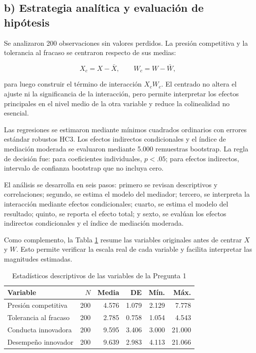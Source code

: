 \documentclass[12pt,letterpaper]{article}
\begin{document}
\subsection{b) Estrategia analítica y evaluación de hipótesis}

Se analizaron 200 observaciones sin valores perdidos. La presión competitiva y la tolerancia al fracaso se centraron respecto de sus medias:

\[
X_c=X-\bar X, \qquad W_c=W-\bar W,
\]

para luego construir el término de interacción $X_cW_c$. El centrado no altera el ajuste ni la significancia de la interacción, pero permite interpretar los efectos principales en el nivel medio de la otra variable y reduce la colinealidad no esencial.

Las regresiones se estimaron mediante mínimos cuadrados ordinarios con errores estándar robustos HC3. Los efectos indirectos condicionales y el índice de mediación moderada se evaluaron mediante 5.000 remuestras bootstrap. La regla de decisión fue: para coeficientes individuales, $p<.05$; para efectos indirectos, intervalo de confianza bootstrap que no incluya cero.

El análisis se desarrolla en seis pasos: primero se revisan descriptivos y correlaciones; segundo, se estima el modelo del mediador; tercero, se interpreta la interacción mediante efectos condicionales; cuarto, se estima el modelo del resultado; quinto, se reporta el efecto total; y sexto, se evalúan los efectos indirectos condicionales y el índice de mediación moderada.


Como complemento, la Tabla \ref{tab:p1-descriptivos} resume las variables originales antes de centrar $X$ y $W$. Esto permite verificar la escala real de cada variable y facilita interpretar las magnitudes estimadas.

\begin{table}[H]
\centering
\caption{Estadísticos descriptivos de las variables de la Pregunta 1}
\label{tab:p1-descriptivos}
\begin{tabular}{lrrrrr}
\toprule
Variable & $N$ & Media & DE & Mín. & Máx. \\
\midrule
Presión competitiva & 200 & 4.576 & 1.079 & 2.129 & 7.778 \\
Tolerancia al fracaso & 200 & 2.785 & 0.758 & 1.054 & 4.543 \\
Conducta innovadora & 200 & 9.595 & 3.406 & 3.000 & 21.000 \\
Desempeño innovador & 200 & 9.639 & 2.983 & 4.113 & 21.066 \\
\bottomrule
\end{tabular}
\end{table}
\end{document}
